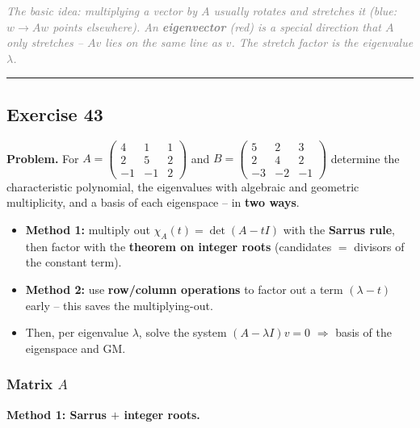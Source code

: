 \documentclass[a4paper,12pt]{article}
\begin{document}
\textcolor{gray}{\small\textit{The basic idea: multiplying a vector by $A$ usually rotates \emph{and} stretches it (blue: $w \to Aw$ points elsewhere). An \textbf{eigenvector} (red) is a special direction that $A$ \emph{only stretches} -- $Av$ lies on the same line as $v$. The stretch factor is the eigenvalue $\lambda$.}}

\bigskip
\hrule
\bigskip

\subsection*{Exercise 43}

\textbf{Problem.} For $A = \begin{pmatrix} 4 & 1 & 1 \\ 2 & 5 & 2 \\ -1 & -1 & 2 \end{pmatrix}$ and $B = \begin{pmatrix} 5 & 2 & 3 \\ 2 & 4 & 2 \\ -3 & -2 & -1 \end{pmatrix}$
determine the characteristic polynomial, the eigenvalues with algebraic and geometric multiplicity, and a basis of each eigenspace -- in \textbf{two ways}.

\begin{wastun}
\begin{itemize}[leftmargin=*, nosep]
    \item \textbf{Method 1:} multiply out $\chi_A(t) = \det(A - tI)$ with the \textbf{Sarrus rule}, then factor with the \textbf{theorem on integer roots} (candidates $=$ divisors of the constant term).
    \item \textbf{Method 2:} use \textbf{row/column operations} to factor out a term $(\lambda - t)$ early -- this saves the multiplying-out.
    \item Then, per eigenvalue $\lambda$, solve the system $(A - \lambda I)v = 0$ $\Rightarrow$ basis of the eigenspace and GM.
\end{itemize}
\end{wastun}

\subsubsection*{Matrix $A$}

\textbf{Method 1: Sarrus $+$ integer roots.}
\end{document}
